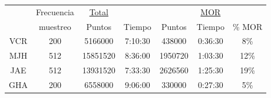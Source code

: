 \begin{table}
\centering
\begin{tabular}{c||c|cc|ccc}
    &Frecuencia& \underline{Total}& &   &\underline{MOR} &         \\
    &muestreo  &Puntos  &  Tiempo   &Puntos  &  Tiempo   &  \% MOR \\
\hline
\hline
VCR &200       & 5166000&   7:10:30 &438000  &   0:36:30 & 8\% \\
MJH &512       &15851520&   8:36:00 &1950720 &   1:03:30 &12\% \\
JAE &512       &13931520&   7:33:30 &2626560 &   1:25:30 &19\% \\
GHA &200       &6558000 &   9:06:00 &330000  &   0:27:30 & 5\% \\

\end{tabular}
\end{table}
